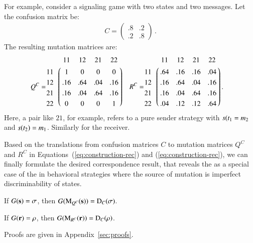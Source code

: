 For example, consider a signaling game with two states and two
messages. Let the confusion matrix be:
\begin{align*}
  C=
  \begin{pmatrix}
    .8 & .2 \\
    .2 & .8 
  \end{pmatrix}\,.
\end{align*}
The resulting mutation matrices are:
\begin{align*}
Q^C & = \bordermatrix{ ~ & 11 & 12 & 21 & 22 \cr
                      11 & 1 & 0 & 0 & 0 \cr
                      12 & .16 & .64 & .04 & .16 \cr
                      21 & .16 & .04 & .64 & .16 \cr
                      22 & 0 & 0 & 0 & 1 \cr}
&                    
  R^C & = \bordermatrix{ ~ & 11 & 12 & 21 & 22 \cr
                      11 & .64 & .16 & .16 & .04 \cr
                      12 & .16 & .64 & .04 & .16 \cr
                      21 & .16 & .04 & .64 & .16 \cr
                      22 & .04 & .12 & .12 & .64 \cr}\,.
\end{align*}
Here, a pair like $21$, for example, refers to a pure sender strategy
with $s(t_1=m_2$ and $s(t_2) =
m_1$. Similarly for the receiver.

Based on the translations from confusion matrices $C$ to mutation
matrices $Q^C$ and $R^C$ in Equations~(\ref{eq:construction-rec}) and
(\ref{eq:construction-rec}), we can finally formulate the
desired correspondence result, that reveals the \rdd as a special case
of the \rmd in behavioral strategies where the source of mutation is
imperfect discriminability of states.

\begin{theorem}
  \label{thm:sender-eq}
  If $G(\mathrm{\mathbf{s}}) = \sigma$, then $G(\mathrm{M}_{Q^C}(\mathrm{\mathbf{s}})) = \mathrm{D}_C(\sigma)$.
\end{theorem}


\begin{theorem}
  \label{thm:receiver-eq}
  If $G(\mathrm{\mathbf{r}}) = \rho$, then $G(\mathrm{M}_{R^C}(\mathrm{\mathbf{r}})) = \mathrm{D}_C(\rho)$.
\end{theorem}

\noindent Proofs are given in Appendix~\ref{sec:proofs}.





